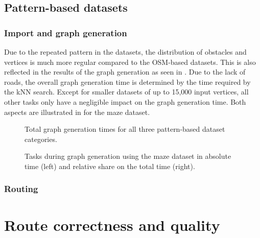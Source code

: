 	\subsection{Pattern-based datasets}
	
		\subsubsection{Import and graph generation}
		
			Due to the repeated pattern in the datasets, the distribution of obstacles and vertices is much more regular compared to the OSM-based datasets.
			This is also reflected in the results of the graph generation as seen in .
			Due to the lack of roads, the overall graph generation time is determined by the time required by the kNN search.
			Except for smaller datasets of up to 15,000 input vertices, all other tasks only have a negligible impact on the graph generation time.
			Both aspects are illustrated in  for the maze dataset.
			
			\begin{figure}[h!]
				\begin{figcenter}
					
				\end{figcenter}
				\caption{Total graph generation times for all three pattern-based dataset categories.}
				\label{fig:eval-import-pattern-abs}
			\end{figure}
			
			\begin{figure}[h!]
				\begin{figcenter}
					
				\end{figcenter}
				\caption{Tasks during graph generation using the maze dataset in absolute time (left) and relative share on the total time (right).}
				\label{fig:eval-import-pattern-maze-abs-rel}
			\end{figure}
		
		\subsubsection{Routing}
		
\section{Route correctness and quality}

